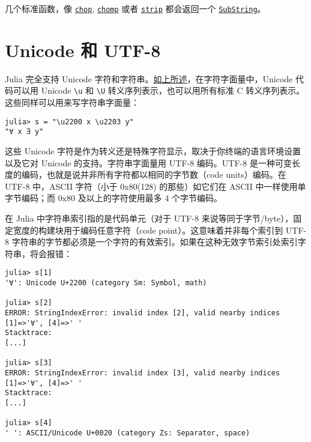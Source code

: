几个标准函数，像 \hyperlink{18002354026785919806}{\texttt{chop}}, \hyperlink{5360081372937794006}{\texttt{chomp}} 或者 \hyperlink{7002432768371197450}{\texttt{strip}} 都会返回一个 \hyperlink{2624824381693370630}{\texttt{SubString}}。



\hypertarget{12357763399910926447}{}


\section{Unicode 和 UTF-8}



Julia 完全支持 Unicode 字符和字符串。\hyperlink{16744269384625214739}{如上所述}，在字符字面量中，Unicode 代码可以用 Unicode \texttt{{\textbackslash}u} 和 \texttt{{\textbackslash}U} 转义序列表示，也可以用所有标准 C 转义序列表示。这些同样可以用来写字符串字面量：




\begin{verbatim}
julia> s = "\u2200 x \u2203 y"
"∀ x ∃ y"
\end{verbatim}



这些 Unicode 字符是作为转义还是特殊字符显示，取决于你终端的语言环境设置以及它对 Unicode 的支持。字符串字面量用 UTF-8 编码。UTF-8 是一种可变长度的编码，也就是说并非所有字符都以相同的字节数（code units）编码。在 UTF-8 中，ASCII 字符（小于 0x80(128) 的那些）如它们在 ASCII 中一样使用单字节编码；而 0x80 及以上的字符使用最多 4 个字节编码。



在 Julia 中字符串索引指的是代码单元（对于 UTF-8 来说等同于字节/byte），固定宽度的构建块用于编码任意字符（code point）。这意味着并非每个索引到 UTF-8 字符串的字节都必须是一个字符的有效索引。如果在这种无效字节索引处索引字符串，将会报错：




\begin{verbatim}
julia> s[1]
'∀': Unicode U+2200 (category Sm: Symbol, math)

julia> s[2]
ERROR: StringIndexError: invalid index [2], valid nearby indices [1]=>'∀', [4]=>' '
Stacktrace:
[...]

julia> s[3]
ERROR: StringIndexError: invalid index [3], valid nearby indices [1]=>'∀', [4]=>' '
Stacktrace:
[...]

julia> s[4]
' ': ASCII/Unicode U+0020 (category Zs: Separator, space)
\end{verbatim}



